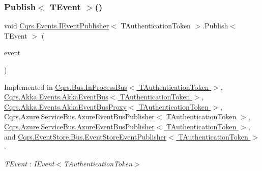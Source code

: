 \subsubsection{\texorpdfstring{Publish$<$ T\+Event $>$()}{Publish< TEvent >()}\hspace{0.1cm}{\footnotesize\ttfamily [1/2]}}
{\footnotesize\ttfamily void \hyperlink{interfaceCqrs_1_1Events_1_1IEventPublisher}{Cqrs.\+Events.\+I\+Event\+Publisher}$<$ T\+Authentication\+Token $>$.Publish$<$ T\+Event $>$ (\begin{DoxyParamCaption}\item[{T\+Event @}]{event }\end{DoxyParamCaption})}



Implemented in \hyperlink{classCqrs_1_1Bus_1_1InProcessBus_afd3d41a5f27a985e9d6ccf3f6f77f11a_afd3d41a5f27a985e9d6ccf3f6f77f11a}{Cqrs.\+Bus.\+In\+Process\+Bus$<$ T\+Authentication\+Token $>$}, \hyperlink{classCqrs_1_1Akka_1_1Events_1_1AkkaEventBus_aaba5d37020e21d03cc2bbc3da14f45ea_aaba5d37020e21d03cc2bbc3da14f45ea}{Cqrs.\+Akka.\+Events.\+Akka\+Event\+Bus$<$ T\+Authentication\+Token $>$}, \hyperlink{classCqrs_1_1Akka_1_1Events_1_1AkkaEventBusProxy_a656daead2fe6f30487855dbaea5a3c83_a656daead2fe6f30487855dbaea5a3c83}{Cqrs.\+Akka.\+Events.\+Akka\+Event\+Bus\+Proxy$<$ T\+Authentication\+Token $>$}, \hyperlink{classCqrs_1_1Azure_1_1ServiceBus_1_1AzureEventBusPublisher_a175365f8217cfe163ffadc891f0cd3e3_a175365f8217cfe163ffadc891f0cd3e3}{Cqrs.\+Azure.\+Service\+Bus.\+Azure\+Event\+Bus\+Publisher$<$ T\+Authentication\+Token $>$}, \hyperlink{classCqrs_1_1Azure_1_1ServiceBus_1_1AzureEventBusPublisher_a175365f8217cfe163ffadc891f0cd3e3_a175365f8217cfe163ffadc891f0cd3e3}{Cqrs.\+Azure.\+Service\+Bus.\+Azure\+Event\+Bus\+Publisher$<$ T\+Authentication\+Token $>$}, and \hyperlink{classCqrs_1_1EventStore_1_1Bus_1_1EventStoreEventPublisher_a1ebb6f08648bdfd5c5bd29fcc12adfea_a1ebb6f08648bdfd5c5bd29fcc12adfea}{Cqrs.\+Event\+Store.\+Bus.\+Event\+Store\+Event\+Publisher$<$ T\+Authentication\+Token $>$}.

\begin{Desc}
\item[Type Constraints]\begin{description}
\item[{\em T\+Event} : {\em I\+Event$<$T\+Authentication\+Token$>$}]\end{description}
\end{Desc}
\mbox{\label{interfaceCqrs_1_1Events_1_1IEventPublisher_a2cbcc3d2c24d015abef6337714ec51ff_a2cbcc3d2c24d015abef6337714ec51ff}} 
